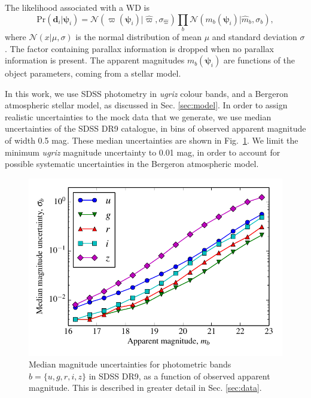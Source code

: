 \documentclass[fleqn,usenatbib]{mnras}
\newcommand{\objp}{\boldsymbol{\psi}}
\newcommand{\data}{\mathbf{d}}
\newcommand{\pr}{\text{Pr}}
\begin{document}
The likelihood associated with a WD is
\begin{equation}\label{eq:likelihood}
	\pr(\data_i | \objp_i) = \mathcal{N}(\varpi(\objp_i)|\hat{\varpi},\sigma_{\hat{\varpi}})\prod_{b} \mathcal{N}(m_b(\objp_i)|\hat{m}_b,\sigma_b),
\end{equation}
where $\mathcal{N}(x | \mu,\sigma)$ is the normal distribution of mean $\mu$ and standard deviation $\sigma$. The factor containing parallax information is dropped when no parallax information is present. The apparent magnitudes $m_b(\objp_i)$ are functions of the object parameters, coming from a stellar model.

In this work, we use SDSS photometry in \emph{ugriz} colour bands, and a Bergeron atmospheric stellar model, as discussed in Sec. \ref{sec:model}. In order to assign realistic uncertainties to the mock data that we generate, we use median uncertainties of the SDSS DR9 catalogue, in bins of observed apparent magnitude of width 0.5 mag. These median uncertainties are shown in Fig.~\ref{fig:magnitude_error}. We limit the minimum \emph{ugriz} magnitude uncertainty to 0.01 mag, in order to account for possible systematic uncertainties in the Bergeron atmospheric model.

\begin{figure}
	\includegraphics[width=\columnwidth]{median_app_errors.pdf}
    \caption{Median magnitude uncertainties for photometric bands $b=\{u,g,r,i,z\}$ in SDSS DR9, as a function of observed apparent magnitude. This is described in greater detail in Sec. \ref{sec:data}.}
    \label{fig:magnitude_error}
\end{figure}
\end{document}
